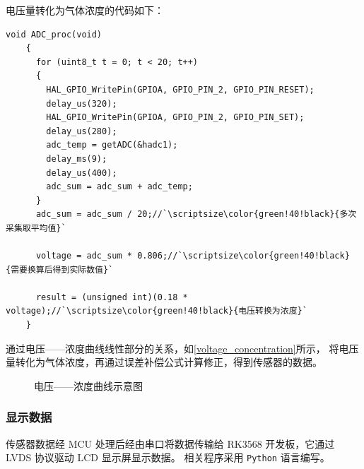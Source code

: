 \documentclass[12pt,hyperref,a4paper,UTF8]{ctexart}
\begin{document}
电压量转化为气体浓度的代码如下：
\begin{lstlisting}[style=Cstyle]
    void ADC_proc(void)
    {
      for (uint8_t t = 0; t < 20; t++)
      {
        HAL_GPIO_WritePin(GPIOA, GPIO_PIN_2, GPIO_PIN_RESET);
        delay_us(320);
        HAL_GPIO_WritePin(GPIOA, GPIO_PIN_2, GPIO_PIN_SET);
        delay_us(280);
        adc_temp = getADC(&hadc1);
        delay_ms(9);
        delay_us(400);
        adc_sum = adc_sum + adc_temp;
      }
      adc_sum = adc_sum / 20;//`\scriptsize\color{green!40!black}{多次采集取平均值}`
    
      voltage = adc_sum * 0.806;//`\scriptsize\color{green!40!black}{需要换算后得到实际数值}`
    
      result = (unsigned int)(0.18 * voltage);//`\scriptsize\color{green!40!black}{电压转换为浓度}`
    }
\end{lstlisting}

通过电压——浓度曲线线性部分的关系，如\autoref{voltage_concentration}所示，
将电压量转化为气体浓度，再通过误差补偿公式计算修正，得到传感器的数据。
\begin{figure}[htbp]
    \centering
{}
    \caption{电压——浓度曲线示意图}
    \label{voltage_concentration}
\end{figure}

\newpage
\subsubsection{显示数据}
传感器数据经 MCU 处理后经由串口将数据传输给 RK3568 开发板，它通过 LVDS 协议驱动 LCD 显示屏显示数据。
相关程序采用 \texttt{Python} 语言编写。
\end{document}
